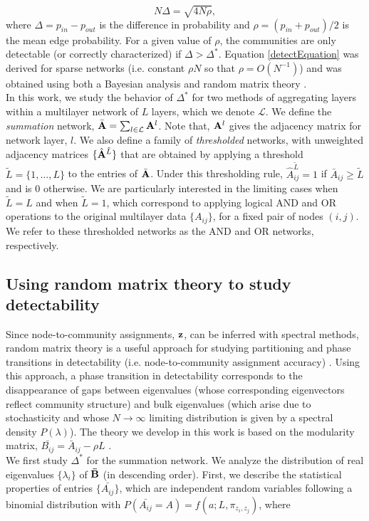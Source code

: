 \begin{equation}
\label{detectEquation}
N\Delta=\sqrt{4N\rho},
\end{equation} 
where $\Delta=p_{in}-p_{out}$ is the difference in probability and $\rho=(p_{in}+p_{out})/2$ is the mean edge probability. For a given value of $\rho$, the communities are only detectable (or correctly characterized) if $\Delta > \Delta^{*}$. Equation \ref{detectEquation} was derived for sparse networks (i.e. constant $\rho N$ so that $\rho=O(N^{-1})$) and was obtained using both a Bayesian analysis \cite{detect23} and random matrix theory \cite{detect24}.\\
\indent In this work, we study the behavior of $\Delta^{*}$ for two methods of aggregating layers within a multilayer network of $L$ layers, which we denote $\mathcal{L}$. We define the \emph{summation} network, $\bar{\bf A}=\sum_{l \in \mathcal{L}} {\bf A}^{l}$. Note that, ${\bf A}^{l}$ gives the adjacency matrix for network layer, $l$. We also define a family of \emph{thresholded} networks, with unweighted adjacency matrices $\{\hat{{\bf A}}^{\tilde{L}}\}$ that are obtained by applying a threshold $\tilde{L}=\{1, \dots, L\}$ to the entries of $\bar{\bf A}$. Under this thresholding rule, $\hat{A}_{ij}^{\tilde{L}}=1$ if $\bar{A}_{ij} \ge \tilde{L}$ and is 0 otherwise. We are particularly interested in the limiting cases when $\tilde{L}=L$ and when $\tilde{L}=1$, which correspond to applying logical AND and OR operations to the original multilayer data $\{A_{ij}\}$, for a fixed pair of nodes $(i,j)$. We refer to these thresholded networks as the AND and OR networks, respectively. 

\subsection{Using random matrix theory to study detectability}

\indent Since node-to-community assignments, ${\bf z}$, can be inferred with spectral methods, random matrix theory \cite{detect38,detect39} is a useful approach for studying partitioning and phase transitions in detectability (i.e. node-to-community assignment accuracy) \cite{detect24,peixotoHierarchAttribute,HierarchAttl}. Using this approach, a phase transition in detectability corresponds to the disappearance of  gaps between eigenvalues (whose corresponding eigenvectors reflect community structure) and bulk eigenvalues (which arise due to stochasticity and whose $N \rightarrow \infty$ limiting distribution is given by a spectral density $P(\lambda)$). The theory we develop in this work is based on the modularity matrix, $\bar{B_{ij}}=\bar{A}_{ij}-\rho L$ \cite{newmangirvan}. \\
\indent We first study $\Delta^{*}$ for the summation network. We analyze the distribution of real eigenvalues $\{\lambda_{i}\}$ of ${\bf \bar{B}}$ (in descending order). First, we describe the statistical properties of entries $\{\bar{A_{ij}}\}$, which are independent random variables following a binomial distribution with $P(\bar{A_{ij}}=A)=f(a;L,\pi_{z_{i},z_{j}})$, where

